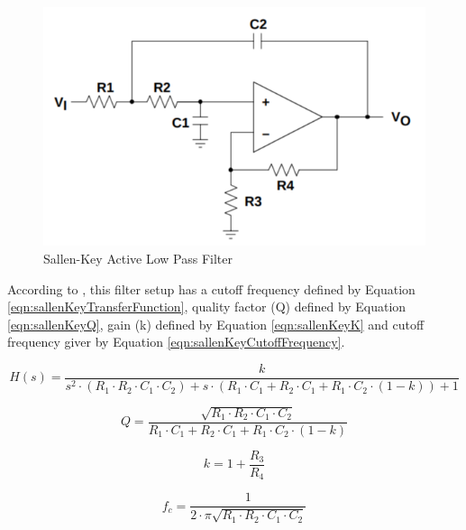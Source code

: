 		\begin{figure}[htbp]
			\centering
				\includegraphics[scale=0.6]{figuras/fig-sallenKeyLPF}
			\caption{Sallen-Key Active Low Pass Filter \cite{texas1999sallenkey}}
			\label{fig:sallenKeyLPF}
		\end{figure}

				According to \cite{texas1999sallenkey}, this filter setup has a cutoff frequency defined by Equation \ref{eqn:sallenKeyTransferFunction}, quality factor (Q) defined by Equation \ref{eqn:sallenKeyQ}, gain (k) defined by Equation \ref{eqn:sallenKeyK} and cutoff frequency giver by Equation \ref{eqn:sallenKeyCutoffFrequency}.

		\begin{equation}\label{eqn:sallenKeyTransferFunction}
			H(s)=\frac{k}{s^{2} \cdot \left( R_{1} \cdot R_{2} \cdot C_{1} \cdot C_{2} \right) + s \cdot \left( R_{1} \cdot C_{1} + R_{2} \cdot C_{1} + R_{1} \cdot C_{2} \cdot \left( 1 - k \right) \right) + 1} 
		\end{equation}

		\begin{equation}\label{eqn:sallenKeyQ}
			Q=\frac{\sqrt{R_{1} \cdot R_{2} \cdot C_{1} \cdot C_{2}}}{R_{1} \cdot C_{1} + R_{2} \cdot C_{1} + R_{1} \cdot C_{2} \cdot \left( 1 - k \right)}
		\end{equation}

		\begin{equation}\label{eqn:sallenKeyK}
			k = 1 + \frac{R_{3}}{R_{4}}
		\end{equation}

		\begin{equation}\label{eqn:sallenKeyCutoffFrequency}
			f_{c}=\frac{1}{2 \cdot \pi \sqrt{R_{1} \cdot R_{2} \cdot C_{1} \cdot C_{2}}} 
		\end{equation}



